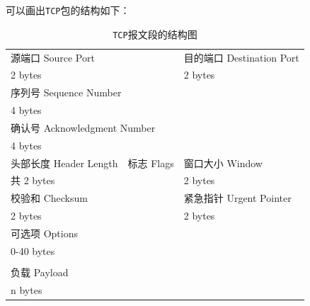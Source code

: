 \documentclass{article}
\begin{document}
可以画出\texttt{TCP}包的结构如下：

\begin{table}[H]
  \centering
  \begin{tabularx}{0.8\textwidth}{|*{4}{X|}}
    \hline
    \multicolumn{2}{|X|}{源端口 Source Port}     & \multicolumn{2}{X|}{目的端口 Destination Port}                                          \\
    \multicolumn{2}{|X|}{2 bytes}                & \multicolumn{2}{X|}{2 bytes}                                                            \\
    \hline
    \multicolumn{4}{|X|}{序列号 Sequence Number}                                                                                           \\
    \multicolumn{4}{|X|}{4 bytes}                                                                                                          \\
    \hline
    \multicolumn{4}{|X|}{确认号 Acknowledgment Number}                                                                                     \\
    \multicolumn{4}{|X|}{4 bytes}                                                                                                          \\
    \hline
    \multicolumn{1}{|X|}{头部长度 Header Length} & \multicolumn{1}{X|}{标志 Flags}                & \multicolumn{2}{X|}{窗口大小 Window}   \\
    \multicolumn{2}{|X|}{共 2 bytes}             & \multicolumn{2}{X|}{2 bytes}                                                            \\
    \hline
    \multicolumn{2}{|X|}{校验和 Checksum}        & \multicolumn{2}{X|}{紧急指针 Urgent Pointer}                                            \\
    \multicolumn{2}{|X|}{2 bytes}                & \multicolumn{2}{X|}{2 bytes}                                                            \\
    \hline
    \multicolumn{4}{|X|}{可选项 Options}                                                                                                   \\
    \multicolumn{4}{|X|}{0-40 bytes}                                                                                                       \\
    \hline
                                                 &                                                &                                      & \\
    \hline
    \multicolumn{4}{|X|}{负载 Payload}                                                                                                     \\
    \multicolumn{4}{|X|}{n bytes}                                                                                                          \\
    \hline
  \end{tabularx}
  \caption{\texttt{TCP}报文段的结构图}
\end{table}
\end{document}
